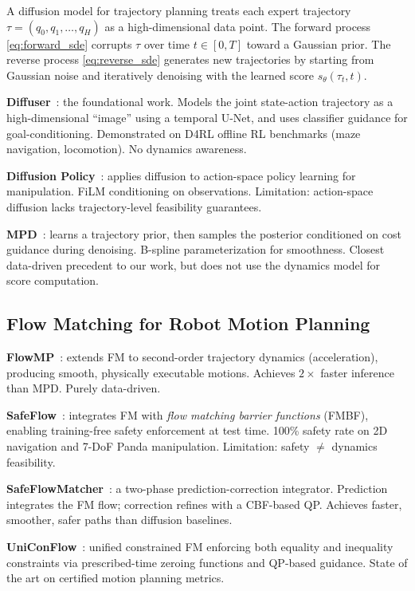 \documentclass[letterpaper, 10pt, conference]{ieeeconf}
\begin{document}
A diffusion model for trajectory planning treats each expert trajectory
$\tau = (q_0,q_1,\ldots,q_H)$ as a high-dimensional data point.  The forward
process \eqref{eq:forward_sde} corrupts $\tau$ over time $t\in[0,T]$ toward a
Gaussian prior.  The reverse process \eqref{eq:reverse_sde} generates new
trajectories by starting from Gaussian noise and iteratively denoising with
the learned score $s_\theta(\tau_t,t)$.

\textbf{Diffuser}~\cite{janner2022}: the foundational work. Models the
joint state-action trajectory as a high-dimensional ``image'' using a temporal
U-Net, and uses classifier guidance for goal-conditioning. Demonstrated on D4RL
offline RL benchmarks (maze navigation, locomotion). No dynamics awareness.

\textbf{Diffusion Policy}~\cite{chi2023diffusionpolicy}: applies diffusion to
action-space policy learning for manipulation. FiLM conditioning on observations.
Limitation: action-space diffusion lacks trajectory-level feasibility guarantees.

\textbf{MPD}~\cite{carvalho2023mpd}: learns a trajectory prior, then samples
the posterior conditioned on cost guidance during denoising. B-spline
parameterization for smoothness. Closest data-driven precedent to our work, but
does not use the dynamics model for score computation.

\subsection{Flow Matching for Robot Motion Planning}

\textbf{FlowMP}~\cite{flowmp}: extends FM to second-order trajectory
dynamics (acceleration), producing smooth, physically executable motions.
Achieves $2\times$ faster inference than MPD. Purely data-driven.

\textbf{SafeFlow}~\cite{safeflow}: integrates FM with \emph{flow
matching barrier functions} (FMBF), enabling training-free safety enforcement
at test time. 100\% safety rate on 2D navigation and 7-DoF Panda manipulation.
Limitation: safety $\ne$ dynamics feasibility.

\textbf{SafeFlowMatcher}~\cite{yang2025safeflowmatcher}: a two-phase
prediction-correction integrator. Prediction integrates the FM flow; correction
refines with a CBF-based QP. Achieves faster, smoother, safer paths than diffusion baselines.

\textbf{UniConFlow}~\cite{yang2025uniconflow}: unified constrained FM enforcing
both equality and inequality constraints via prescribed-time zeroing functions
and QP-based guidance. State of the art on certified motion planning metrics.
\end{document}
